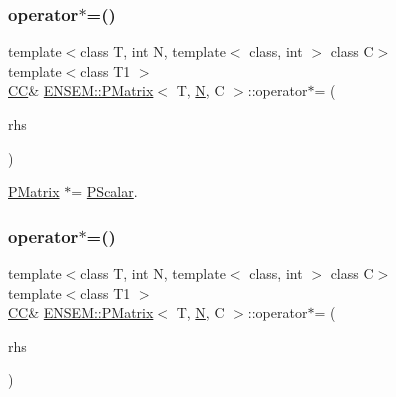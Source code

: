 \mbox{\label{classENSEM_1_1PMatrix_a4c25aeda146eb61d41abf6cf625a6153}} 
\subsubsection{\texorpdfstring{operator$\ast$=()}{operator*=()}\hspace{0.1cm}{\footnotesize\ttfamily [1/3]}}
{\footnotesize\ttfamily template$<$class T, int N, template$<$ class, int $>$ class C$>$ \\
template$<$class T1 $>$ \\
\mbox{\hyperlink{classENSEM_1_1PMatrix_a744bac549029029effe32dc1705660ec}{CC}}\& \mbox{\hyperlink{classENSEM_1_1PMatrix}{E\+N\+S\+E\+M\+::\+P\+Matrix}}$<$ T, \mbox{\hyperlink{adat__devel_2lib_2hadron_2operator__name__util_8cc_a7722c8ecbb62d99aee7ce68b1752f337}{N}}, C $>$\+::operator$\ast$= (\begin{DoxyParamCaption}\item[{const \mbox{\hyperlink{classENSEM_1_1PScalar}{P\+Scalar}}$<$ T1 $>$ \&}]{rhs }\end{DoxyParamCaption})\hspace{0.3cm}{\ttfamily [inline]}}



\mbox{\hyperlink{classENSEM_1_1PMatrix}{P\+Matrix}} $\ast$= \mbox{\hyperlink{classENSEM_1_1PScalar}{P\+Scalar}}. 

\mbox{\label{classENSEM_1_1PMatrix_a4c25aeda146eb61d41abf6cf625a6153}} 
\subsubsection{\texorpdfstring{operator$\ast$=()}{operator*=()}\hspace{0.1cm}{\footnotesize\ttfamily [2/3]}}
{\footnotesize\ttfamily template$<$class T, int N, template$<$ class, int $>$ class C$>$ \\
template$<$class T1 $>$ \\
\mbox{\hyperlink{classENSEM_1_1PMatrix_a744bac549029029effe32dc1705660ec}{CC}}\& \mbox{\hyperlink{classENSEM_1_1PMatrix}{E\+N\+S\+E\+M\+::\+P\+Matrix}}$<$ T, \mbox{\hyperlink{adat__devel_2lib_2hadron_2operator__name__util_8cc_a7722c8ecbb62d99aee7ce68b1752f337}{N}}, C $>$\+::operator$\ast$= (\begin{DoxyParamCaption}\item[{const \mbox{\hyperlink{classENSEM_1_1PScalar}{P\+Scalar}}$<$ T1 $>$ \&}]{rhs }\end{DoxyParamCaption})\hspace{0.3cm}{\ttfamily [inline]}}



